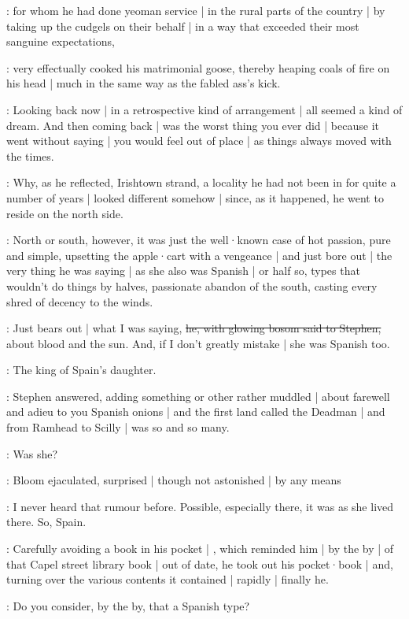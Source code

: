 :
for whom he had done yeoman service |
in the rural parts of the country |
by taking up the cudgels on their behalf |
in a way that exceeded their most sanguine expectations,

:
very effectually cooked his matrimonial goose,
thereby heaping coals of fire on his head |
much in the same way as the fabled ass's kick.%

:
Looking back now |
in a retrospective kind of arrangement |
all seemed a kind of dream.
And then coming back |
was the worst thing you ever did |
because it went without saying |
you would feel out of place |
as things always moved with the times.

:
Why,
as he reflected,
Irishtown strand,
a locality he had not been in for quite a number of years |
looked different somehow |
since,
as it happened,
he went to reside on the north side.

:
North or south,
however,
it was just the well·known case of hot passion,
pure and simple,
upsetting the apple·cart with a vengeance |
and just bore out |
the very thing he was saying |
as she also was Spanish |
or half so,
types that wouldn't do things by halves,
passionate abandon of the south,
casting every shred of decency to the winds.%

\Bloom:
Just bears out |
what I was saying,
\sout{he, with glowing bosom said to Stephen,}
about blood and the sun.
And,
if I don't greatly mistake |
she was Spanish too.

\Stephen:
The king of Spain's daughter.

:
Stephen answered,
adding something or other rather muddled |
about farewell and adieu to you Spanish onions |
and the first land called the Deadman |
and from Ramhead to Scilly |
was so and so many.

\Bloom:
Was she?

:
Bloom ejaculated,
surprised |
though not astonished |
by any means

\Bloom:
I never heard that rumour before.
Possible,
especially there,
it was as she lived there.
So,
Spain.%

:
Carefully avoiding a book in his pocket |
,
which reminded him |
by the by |
of that Capel street library book |
out of date,
he took out his pocket·book |
and,
turning over the various contents it contained |
rapidly |
finally he.

\Bloom:
Do you consider,
by the by,
that a Spanish type?

